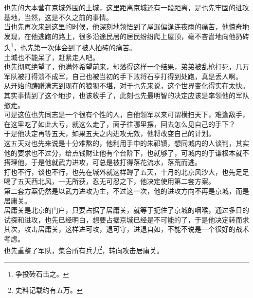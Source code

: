 \begin{multicols}{\theparacolNo}
也先的大本营在京城外围的土城，这里距离京城还有一段距离，是也先牢固的进攻基地，当然，这是不久之前的事情。\\

当也先再次来到这里的时候，他深刻地领悟到了屋漏偏逢连夜雨的痛苦，他惊奇地发现，在他逃跑的路上，很多沿途民居的居民纷纷爬上屋顶，毫不吝啬地向他扔砖头\footnote{争投砖石击之。}，也先第一次体会到了被人拍砖的痛苦。\\

土城也不能呆了，赶紧走人吧。\\

也先彻底绝望了，他满怀希望前来，却落得这样一个结果，弟弟被乱枪打死，几万军队被打得溃不成军，自己也被当初的手下败将石亨打得到处跑，真是丢人啊。\\

从开始的踌躇满志到现在的狼狈不堪，对于也先来说，这个世界变化得实在太快。\\

其实事情到了这个地步，也该收手了，此刻也先最明智的决定应该是率领他的军队撤走。\\

可是这位也先同志是一个很有个性的人，自他领军以来可谓横扫天下，难逢敌手，在这里吃了如此大亏，就这么走了，面子往哪里摆，回去怎么见自己的手下？\\

于是他决定再等五天，如果五天之内进攻无效，他将改变自己的计划。\\

这五天对也先来说是十分难熬的，他利用手中的朱祁镇，想同城内的人谈判，其实他的要求也不过分，给点钱财让他有个台阶下，也就够了，可城内的于谦根本就不搭理他，于是他就武力进攻，可总是被打得落花流水，落荒而逃。\\

打也不行，谈也不行，也先在城外就这样蹲了五天，十月的北京风沙大，也先足足喝了五天西北风，一无所获，忍无可忍之下，他决定使用第二套方案。\\

第二套方案仍然是以武力进攻为主，不过这一次，他的进攻方向不再是京城，而是居庸关。\\

居庸关是北京的门户，只要占据了居庸关，就等于扼住了京城的咽喉，通过多日的试探和进攻，也先已经明白，想要占据京城已经是不可能的了，于是他决定转而求其次，攻击居庸关，这样进可攻，退可守，进退自如，不能不说是一个很好的战术考虑。\\

也先重整了军队，集合所有兵力\footnote{史料记载约有五万。}，转向攻击居庸关。\\


\end{multicols}
